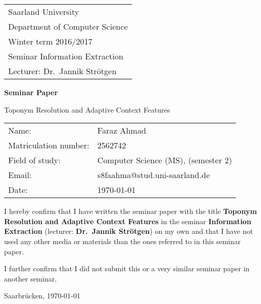 \documentclass[
     11pt,         %
     a4paper,      %
     oneside,
     ]{article}
\makeatletter
\newcommand{\mytitle}{Toponym Resolution and Adaptive Context Features}
\newcommand{\myauthor}{Faraz Ahmad}
\newcommand{\myseminar}{Information Extraction}
\newcommand{\mysemester}{Winter term 2016/2017}
\newcommand{\mydozent}{Dr.~Jannik Strötgen}
\newcommand{\myMatrikelnummer}{2562742}
\newcommand{\myStudiengang}{Computer Science (MS)}
\newcommand{\mySemester}{2}
\newcommand{\myEmail}{s8faahma@stud.uni-saarland.de}
\makeatother
\begin{document}
\begin{titlepage}
\begin{tabular}[l]{l}
Saarland University\\
Department of Computer Science\\
\mysemester\\
Seminar \myseminar\\
Lecturer: \mydozent\\
\end{tabular}

\vspace{4cm}
\begin{center}
\textbf{\large Seminar Paper} 
\vspace{0.5\baselineskip}

{\huge
\mytitle
}
\end{center}

\vfill 
\begin{tabular}[l]{ll}
Name:                 & \myauthor\\
Matriculation number: & \myMatrikelnummer\\
Field of study:       & \myStudiengang, (semester \mySemester )\\
Email:                & \myEmail\\
Date:                 & \today \\
\end{tabular}

\end{titlepage}

\onehalfspacing


\thispagestyle{empty}\label{declaration}
\vspace*{100pt}
I hereby confirm that I have written the seminar paper with the title \textbf{\mytitle}
in the seminar \textbf{\myseminar} (lecturer: \textbf{\mydozent}) on my own and that I 
have not used any other media or materials than the ones referred to in this seminar paper. 

I further confirm that I did not submit this or a very similar seminar paper in another seminar.
\vspace*{50pt}

Saarbrücken, \today \hspace{2cm} \underline{\phantom{Some space for your signature}}
\newpage
\end{document}
